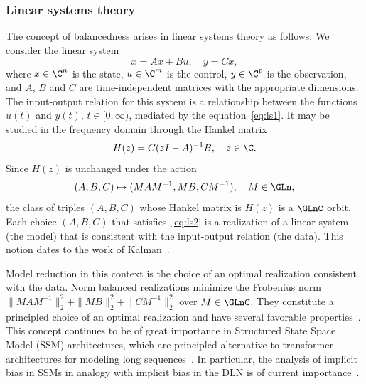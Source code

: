 \subsubsection{Linear systems theory\/} 
The concept of balancedness arises in linear systems theory as follows. We consider the linear system
\begin{equation}
    \label{eq:ls1}
    \dot{x} = A x + B u, \quad y = Cx,
\end{equation}
where $x \in \C^n$ is the state, $u \in \C^m$ is the control, $y\in \C^p$ is the observation, and $A$, $B$ and $C$ are time-independent matrices with the appropriate dimensions. The input-output relation for this system is a relationship between the functions $u(t)$ and $y(t)$, $t \in [0,\infty)$, mediated by the equation~\eqref{eq:ls1}. It may be studied in the frequency domain through the Hankel matrix 
\begin{equation}
    \label{eq:ls2} H(z) = C (zI - A)^{-1}B, \quad z \in \C.
\end{equation}
Since $H(z)$ is unchanged under the action
\begin{equation}
    \label{eq:ls3}
    (A,B,C) \mapsto (MAM^{-1}, MB, CM^{-1}), \quad M \in \GLn,
\end{equation}
the class of triples ${(A,B,C)}$ whose Hankel matrix is $H(z)$ is a $\GLnC$ orbit.
Each choice $(A,B,C)$ that satisfies~\eqref{eq:ls2} is a realization of a linear system (the model) that is consistent with the input-output relation (the data). This notion dates to the work of Kalman~\cite{Kalman-real}. 

Model reduction in this context is the choice of an optimal realization consistent with the data. Norm balanced realizations minimize the Frobenius norm $\|MAM^{-1}\|_2^2 + \|MB\|_2^2 + \|CM^{-1}\|_2^2$ over $M \in \GLnC$. They constitute a principled choice of an optimal realization and have several favorable properties~\cite{Helmke}. This concept continues to be of great importance in Structured State Space Model (SSM) architectures, which are principled alternative to transformer architectures for modeling long sequences~\cite{Gu1}. In particular, the analysis of implicit bias in SSMs in analogy with implicit bias in the DLN is of current importance~\cite{Cohen-Karlik1,Cohen-Karlik2}.



